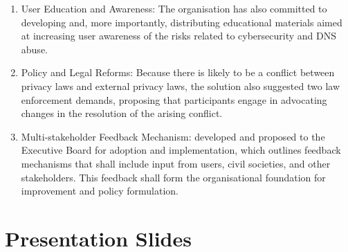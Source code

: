 \begin{itemize}
\begin{enumerate}
    \item User Education and Awareness: The organisation has also committed to developing and, more importantly, distributing educational materials aimed at increasing user awareness of the risks related to cybersecurity and DNS abuse. 
    \item Policy and Legal Reforms: Because there is likely to be a conflict between privacy laws and external privacy laws, the solution also suggested two law enforcement demands, proposing that participants engage in advocating changes in the resolution of the arising conflict. 
    \item Multi-stakeholder Feedback Mechanism: developed and proposed to the Executive Board for adoption and implementation, which outlines feedback mechanisms that shall include input from users, civil societies, and other stakeholders. This feedback shall form the organisational foundation for improvement and policy formulation.
    \end{enumerate}
        
\end{itemize}





\section{Presentation Slides}

